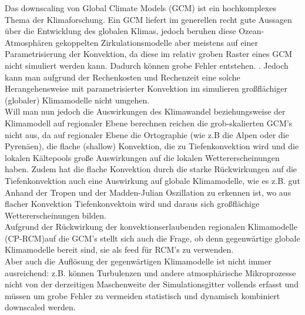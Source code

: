 Das downscaling von Global Climate Models (GCM) ist ein hochkomplexes Thema der Klimaforschung. Ein GCM liefert im generellen recht gute Aussagen über die Entwicklung des globalen Klimas, jedoch beruhen diese Ozean-Atmosphären gekoppelten Zirkulationsmodelle aber meistens auf einer Parametrisierung der Konvektion, da diese im relativ groben Raster eines GCM nicht simuliert werden kann. Dadurch können grobe Fehler entstehen. \cite[vgl.][Stevens \& Bony]{stevensbony}. Jedoch kann man aufgrund der Rechenkosten und Rechenzeit eine solche Herangehensweise mit parametrisierter Konvektion im simulieren großflächiger (globaler) Klimamodelle  nicht umgehen.\\
Will man nun jedoch die Auswirkungen des Klimawandel beziehungsweise der Klimamodell auf regionaler Ebene berechnen reichen die grob-skalierten GCM's nicht aus, da auf regionaler Ebene die Ortographie (wie z.B die Alpen oder die Pyrenäen), die flache (shallow) Konvektion, die zu Tiefenkonvektion wird und die lokalen Kältepools große Auswirkungen auf die lokalen Wettererscheinungen haben. Zudem hat die flache Konvektion durch die starke Rückwirkungen auf die Tiefenkonvektion auch eine Auswirkung auf globale Klimamodelle, wie es z.B. gut Anhand der Tropen \cite[vgl.][Teixeara et al.]{teixeracardoso} und der Madden-Julian Oszillation\cite[vgl.][Chen S. et al.]{chenshuyi} zu erkennen ist, wo aus flacher Konvektion Tiefenkonvektoin wird und daraus sich großflächige Wettererscheinungen bilden.\\
Aufgrund der Rückwirkung der konvektionserlaubenden regionalen Klimamodelle (CP-RCM)auf die GCM's stellt sich auch die Frage, ob denn gegenwärtige globale Klimamodelle bereit sind, sie als feed für RCM's zu verwenden.\\
Aber auch die Auflösung der gegenwärtigen Klimamodelle ist nicht immer ausreichend: z.B. können Turbulenzen und andere atmosphärische Mikroprozesse nicht von der derzeitigen Maschenweite der Simulationsgitter vollends erfasst und müssen um grobe Fehler zu vermeiden statistisch und dynamisch kombiniert downscaled werden. \cite[vgl.][Maraun et al.]{marauntowards}\\



